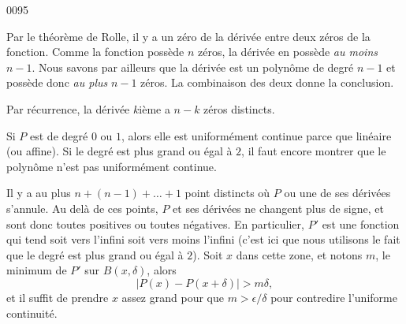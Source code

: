 
\begin{corrige}{0095}

Par le théorème de Rolle, il y a un zéro de la dérivée entre deux zéros de la fonction. Comme la fonction possède $n$ zéros, la dérivée en possède \emph{au moins} $n-1$. Nous savons par ailleurs que la dérivée est un polynôme de degré $n-1$ et possède donc \emph{au plus} $n-1$ zéros. La combinaison des deux donne la conclusion.

Par récurrence, la dérivée $k$ième a $n-k$ zéros distincts.

Si $P$ est de degré $0$ ou $1$, alors elle est uniformément continue parce que linéaire (ou affine). Si le degré est plus grand ou égal à $2$, il faut encore montrer que le polynôme n'est pas uniformément continue.

Il y a au plus $n+(n-1)+\ldots+1$ point distincts où $P$ ou une de ses dérivées s'annule. Au delà de ces points, $P$ et ses dérivées ne changent plus de signe, et sont donc toutes positives ou toutes négatives. En particulier, $P'$ est une fonction qui tend soit vers l'infini soit vers moins l'infini (c'est ici que nous utilisons le fait que le degré est plus grand ou égal à $2$). Soit $x$ dans cette zone, et notons $m$, le minimum de $P'$ sur $B(x,\delta)$, alors
\begin{equation}
	| P(x)-P(x+\delta) |>m\delta,
\end{equation}
et il suffit de prendre $x$ assez grand pour que $m>\epsilon/\delta$ pour contredire l'uniforme continuité.

\end{corrige}
